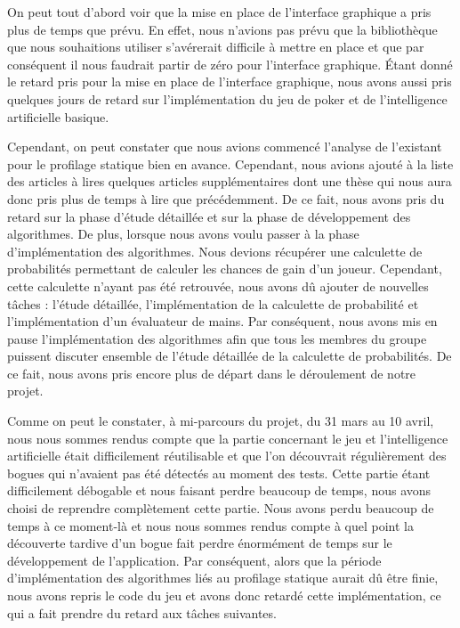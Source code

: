 \documentclass{report}
\begin{document}
On peut tout d'abord voir que la mise en place de l'interface graphique a pris plus de temps que prévu. En effet, nous n'avions pas prévu que la bibliothèque que nous souhaitions utiliser s’avérerait difficile à mettre en place et que par conséquent il nous faudrait partir de zéro pour l'interface graphique. Étant donné le retard pris pour la mise en place de l'interface graphique, nous avons aussi pris quelques jours de retard sur l'implémentation du jeu de poker et de l'intelligence artificielle basique. \par
Cependant, on peut constater que nous avions commencé l'analyse de l'existant pour le profilage statique bien en avance. Cependant, nous avions ajouté à la liste des articles à lires quelques articles supplémentaires dont une thèse qui nous aura donc pris plus de temps à lire que précédemment. De ce fait, nous avons pris du retard sur la phase d'étude détaillée et sur la phase de développement des algorithmes. De plus, lorsque nous avons voulu passer à la phase d'implémentation des algorithmes. Nous devions récupérer une calculette de probabilités permettant de calculer les chances de gain d'un joueur. Cependant, cette calculette n'ayant pas été retrouvée, nous avons dû ajouter de nouvelles tâches : l'étude détaillée, l'implémentation de la calculette de probabilité et l'implémentation d'un évaluateur de mains. Par conséquent, nous avons mis en pause l'implémentation des algorithmes afin que tous les membres du groupe puissent discuter ensemble de l'étude détaillée de la calculette de probabilités. De ce fait, nous avons pris encore plus de départ dans le déroulement de notre projet. \par

Comme on peut le constater, à mi-parcours du projet, du 31 mars au 10 avril, nous nous sommes rendus compte que la partie concernant le jeu et l'intelligence artificielle était difficilement réutilisable et que l'on découvrait régulièrement des bogues qui n'avaient pas été détectés au moment des tests. Cette partie étant difficilement débogable et nous faisant perdre beaucoup de temps, nous avons choisi de reprendre complètement cette partie. Nous avons perdu beaucoup de temps à ce moment-là et nous nous sommes rendus compte à quel point la découverte tardive d'un bogue fait perdre énormément de temps sur le développement de l'application. Par conséquent, alors que la période d'implémentation des algorithmes liés au profilage statique aurait dû être finie, nous avons repris le code du jeu et avons donc retardé cette implémentation, ce qui a fait prendre du retard aux tâches suivantes.\par
\end{document}
